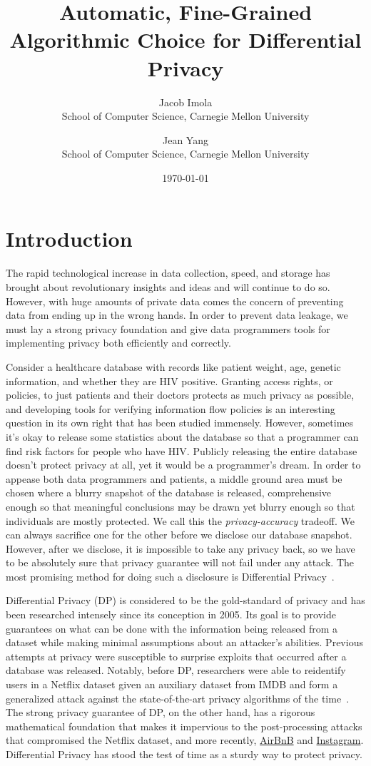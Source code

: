 \documentclass[11pt]{report}
\title{Automatic, Fine-Grained Algorithmic Choice for Differential Privacy}
\date{\today}
\author{Jacob Imola\\ School of Computer Science, Carnegie Mellon University\and Jean Yang\\ School of Computer Science, Carnegie Mellon University}
\begin{document}
\maketitle
\chapter{Introduction}\label{ch:intro}
The rapid technological increase in data collection, speed, and storage has brought about revolutionary insights and ideas and will continue to do so. However, with huge amounts of private data comes the concern of preventing data from ending up in the wrong hands. In order to prevent data leakage, we must lay a strong privacy foundation and give data programmers tools for implementing privacy both efficiently and correctly.

Consider a healthcare database with records like patient weight, age, genetic information, and whether they are HIV positive. Granting access rights, or policies, to just patients and their doctors protects as much privacy as possible, and developing tools for verifying information flow policies is an interesting question in its own right that has been studied immensely. However, sometimes it's okay to release some statistics about the database so that a programmer can find risk factors for people who have HIV. Publicly releasing the entire database doesn't protect privacy at all, yet it would be a programmer's dream. In order to appease both data programmers and patients, a middle ground area must be chosen where a blurry snapshot of the database is released, comprehensive enough so that meaningful conclusions may be drawn yet blurry enough so that individuals are mostly protected. We call this the \emph{privacy-accuracy} tradeoff. We can always sacrifice one for the other before we disclose our database snapshot. However, after we disclose, it is impossible to take any privacy back, so we have to be absolutely sure that privacy guarantee will not fail under any attack. The most promising method for doing such a disclosure is Differential Privacy~\cite{Dwork:2006}.

Differential Privacy (DP) is considered to be the gold-standard of privacy and has been researched intensely since its conception in 2005. Its goal is to provide guarantees on what can be done with the information being released from a dataset while making minimal assumptions about an attacker's abilities. Previous attempts at privacy were susceptible to surprise exploits that occurred after a database was released. Notably, before DP, researchers were able to reidentify users in a Netflix dataset given an auxiliary dataset from IMDB and form a generalized attack against the state-of-the-art privacy algorithms of the time~\cite{Narayanan:2006}. The strong privacy guarantee of DP, on the other hand, has a rigorous mathematical foundation that makes it impervious to the post-processing attacks that compromised the Netflix dataset, and more recently, \href{https://hackernoon.com/how-to-rob-an-airbnb-252e7e7eda44}{AirBnB} and \href{https://gizmodo.com/this-is-almost-certainly-james-comey-s-twitter-account-1793843641}{Instagram}. Differential Privacy has stood the test of time as a sturdy way to protect privacy.
\end{document}
